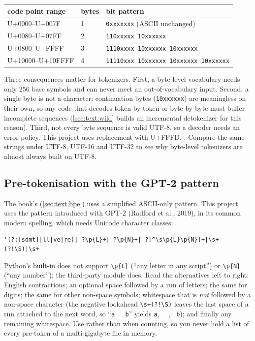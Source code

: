 \begin{center}\small
\begin{tabular}{@{}lll@{}}
\toprule
code point range & bytes & bit pattern\\
\midrule
U+0000--U+007F & 1 & \texttt{0xxxxxxx} (ASCII unchanged)\\
U+0080--U+07FF & 2 & \texttt{110xxxxx 10xxxxxx}\\
U+0800--U+FFFF & 3 & \texttt{1110xxxx 10xxxxxx 10xxxxxx}\\
U+10000--U+10FFFF & 4 & \texttt{11110xxx 10xxxxxx 10xxxxxx 10xxxxxx}\\
\bottomrule
\end{tabular}
\end{center}

Three consequences matter for tokenizers. First, a byte-level vocabulary needs only 256 base
symbols and can never meet an out-of-vocabulary input. Second, a single byte is not a character:
continuation bytes (\texttt{10xxxxxx}) are meaningless on their own, so any code that decodes
token-by-token or byte-by-byte must buffer incomplete sequences (\cref{sec:text:wild} builds an
incremental detokenizer for this reason). Third, not every byte sequence is valid UTF-8, so a
decoder needs an error policy. This project uses replacement with U+FFFD,
. Compare the same strings under UTF-8, UTF-16 and
UTF-32 to see why byte-level tokenizers are almost always built on UTF-8.

\subsection{Pre-tokenisation with the GPT-2 pattern}

The book's  (\cref{sec:text:bpe}) uses a simplified ASCII-only pattern.
This project uses the pattern introduced with GPT-2 (Radford et al., 2019), in its common modern
spelling, which needs Unicode character classes:
\begin{lstlisting}[style=plain]
'(?:[sdmt]|ll|ve|re)| ?\p{L}+| ?\p{N}+| ?[^\s\p{L}\p{N}]+|\s+(?!\S)|\s+
\end{lstlisting}
Python's built-in  does not support \verb|\p{L}| (``any letter in any script'') or
\verb|\p{N}| (``any number''); the third-party  module does. Read the alternatives
left to right: English contractions; an optional space followed by a run of letters; the same for
digits; the same for other non-space symbols; whitespace that is \emph{not} followed by a
non-space character (the negative lookahead \verb|\s+(?!\S)| leaves the last space of a run
attached to the next word, so ``\verb*|a   b|'' yields \verb*|a|, \verb*|  |, \verb*| b|); and
finally any remaining whitespace. Use  rather than  when counting,
so you never hold a list of every pre-token of a multi-gigabyte file in memory.

